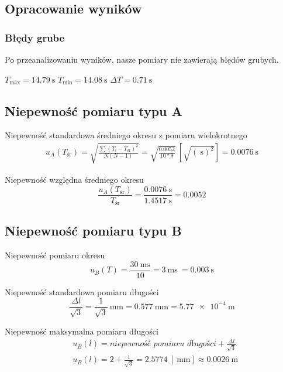\documentclass{fizykalab}
\begin{document}
{  \subsection*{Opracowanie wyników}
  \subsubsection*{Błędy grube}
  \par
  Po przeanalizowaniu wyników, nasze pomiary nie zawierają błędów grubych.

  $T_{\text{max}} = \SI{14.79}{\second}$ \quad $T_{\text{min}} = \SI{14.08}{\second}$ \quad $\Delta T = \SI{0.71}{\second}$

  \subsection*{Niepewność pomiaru typu A}
  \par
  Niepewność standardowa średniego okresu z pomiaru wielokrotnego
  \begin{gather*}
	  u_A(T_\text{śr}) = \sqrt{ \frac{ \sum{(T_i - T_\text{śr})^2} }{ N(N-1) } } = \sqrt{\frac{0.0052}{10*9}} \ [\sqrt{(\SI{}{\second})^2}] = \SI{0.0076}{\second}
  \end{gather*}

  \par
  Niepewność względna średniego okresu
  \[ \frac{u_A(T_\text{śr})}{T_\text{śr}} = \frac{\SI{0.0076}{\second}}{\SI{1.4517}{\second}} =  0.0052\]

  \subsection*{Niepewność pomiaru typu B}
  \par
  Niepewność pomiaru okresu
  \[ u_B(T) = \frac{\SI{30}{\milli\second}}{10} = \SI{3}{\milli\second}\ = \SI{0.003}{\second} \]

  \par
  Niepewność standardowa pomiaru długości
  \[ \frac{\Delta l}{\sqrt{3}} = \frac{1}{\sqrt{3}} \SI{}{\milli\meter} = \SI{0.577}{\milli\meter} = \SI{5.77e-4}{\meter} \]

  \par
  Niepewność maksymalna pomiaru długości
  \begin{align*}
	   & u_B(l) = \textit{niepewność pomiaru długości} + \frac{\Delta l}{\sqrt{3}}
	  \\
	   & u_B(l) = 2 + \frac{1}{\sqrt{3}}= 2.5774 \ [\SI{}{\milli\meter}] \approx \SI{0.0026}{\meter}
  \end{align*}

}
\end{document}
